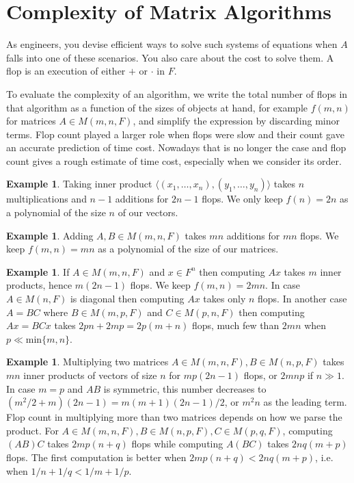 \documentclass[12pt]{amsart}
\theoremstyle{definition}
\newtheorem{example}[theorem]{Example}
\begin{document}
\section{Complexity of Matrix Algorithms} As engineers, you devise efficient ways to solve such systems of equations when $A$ falls into one of these scenarios. You also care about the cost to solve them. 
\dfn A flop is an execution of either $+$ or $\cdot$ in $F$.

To evaluate the complexity of an algorithm, we write the total number of flops in that algorithm as a function of the sizes of objects at hand, for example $f(m, n)$ for matrices $A \in M(m, n,F)$, and simplify the expression by discarding minor terms. Flop count played a larger role when flops were slow and their count gave an accurate prediction of time cost. Nowadays that is no longer the case and flop count gives a rough estimate of time cost, especially when we consider its order.

\begin{example} Taking inner product $\langle (x_1, \dots, x_n), (y_1, \dots, y_n)\rangle$ takes $n$ multiplications and $n-1$ additions for $2n-1$ flops. We only keep $f(n) = 2n$ as a polynomial of the size $n$ of our vectors.
\end{example}

\begin{example} Adding $A, B \in M(m, n,F)$ takes $mn$ additions for $mn$ flops. We keep $f(m, n) = mn$ as a polynomial of the size of our matrices.
\end{example}

\begin{example} If $A \in M(m, n,F)$ and $x \in F^n$ then computing $Ax$ takes $m$ inner products, hence $m(2n-1)$ flops. We keep $f(m, n) = 2mn$. In case $A \in M(n, F)$ is diagonal then computing $Ax$ takes only $n$ flops. In another case $A = BC$ where $B \in M(m,p,F)$ and $C \in M(p, n, F)$ then computing $Ax = BCx$ takes $2pn + 2mp = 2p(m + n)$ flops, much few than $2mn$ when $p \ll \text{min}\{m, n\}$.
\end{example}

\begin{example} Multiplying two matrices $A \in M(m, n,F), B \in M(n, p, F)$ takes $mn$ inner products of vectors of size $n$ for $mp(2n-1)$ flops, or $2mnp$ if $n \gg 1$. In case $m = p$ and $AB$ is symmetric, this number decreases to $(m^2/2 + m)(2n -1) = m(m+1)(2n-1)/2$, or $m^2n$ as the leading term. Flop count in multiplying more than two matrices depends on how we parse the product. For $A \in M(m, n,F), B \in M(n,p,F), C \in M(p,q,F)$, computing $(AB)C$ takes $2mp(n+q)$ flops while computing $A(BC)$ takes $2nq(m+p)$ flops. The first computation is better when $2mp(n+q) < 2nq(m+p)$, i.e. when $1/n + 1/q < 1/m + 1/p$.
\end{example}
\end{document}

